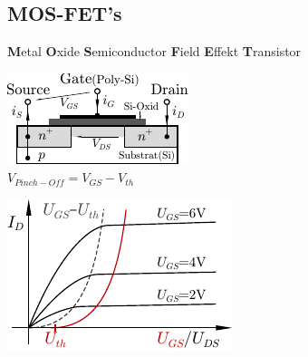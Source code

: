 \documentclass[6pt,a4paper]{scrartcl}
\begin{document}
\begin{multicols*}{3}
\section{MOS-FET's}
\textbf{M}etal \textbf{O}xide \textbf{S}emiconductor \textbf{F}ield \textbf{E}ffekt \textbf{T}ransistor\\
\parbox{4.0cm}{ \includegraphics{./img/ds/mosfet.pdf} \\ $V_{Pinch-Off} = V_{GS} - V_{th}$ } \parbox{3.0cm}{ \includegraphics{./img/ds/char_nmos.pdf} }



\end{multicols*}
\end{document}
